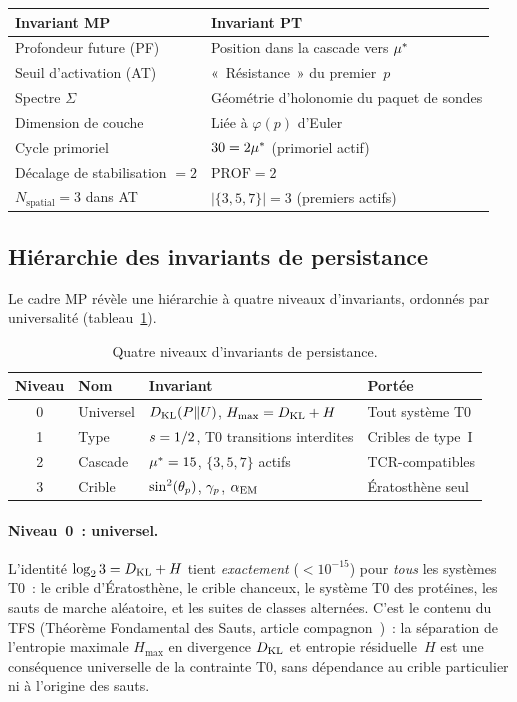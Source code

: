 \documentclass[12pt,a4paper]{article}
\begin{document}
\begin{center}
\begin{tabular}{ll}
\toprule
\textbf{Invariant MP} & \textbf{Invariant PT} \\
\midrule
Profondeur future (PF) & Position dans la cascade vers ${\mu^{*}}$ \\
Seuil d'activation (AT) & «~Résistance~» du premier~$p$ \\
Spectre $\Sigma$ & Géométrie d'holonomie du paquet de sondes \\
Dimension de couche & Liée à $\varphi(p)$ d'Euler \\
Cycle primoriel & $30 = 2{\mu^{*}}$ (primoriel actif) \\
Décalage de stabilisation $= 2$ & $\mathrm{PROF} = 2$ \\
$N_{\mathrm{spatial}} = 3$ dans AT & $|\{3, 5, 7\}| = 3$ (premiers actifs) \\
\bottomrule
\end{tabular}
\end{center}


\subsection{Hiérarchie des invariants de persistance}
\label{sec:PM_hierarchy}

Le cadre MP révèle une hiérarchie à quatre niveaux d'invariants,
ordonnés par universalité (tableau~\ref{tab:PM_hierarchy}).

\begin{table}[htbp]
\centering
\caption{Quatre niveaux d'invariants de persistance.}
\label{tab:PM_hierarchy}
\begin{tabular}{clll}
\toprule
\textbf{Niveau} & \textbf{Nom} & \textbf{Invariant} & \textbf{Portée} \\
\midrule
0 & Universel & $D_{\mathrm{KL}}(P \| U)$, $H_{\max} = D_{\mathrm{KL}} + H$ & Tout système T0 \\
1 & Type & $s = 1/2$, T0 transitions interdites & Cribles de type~I \\
2 & Cascade & ${\mu^{*}} = 15$, $\{3,5,7\}$ actifs & TCR-compatibles \\
3 & Crible & $\sin^2(\theta_{p})$, $\gamma_{p}$, $\alpha_{\mathrm{EM}}$ & Ératosthène seul \\
\bottomrule
\end{tabular}
\end{table}

\paragraph{Niveau~0~: universel.}
L'identité $\log_2 3 = D_{\mathrm{KL}} + H$ tient \emph{exactement}
($< 10^{-15}$) pour \emph{tous} les systèmes T0~: le crible
d'Ératosthène, le crible chanceux, le système T0 des protéines, les
sauts de marche aléatoire, et les suites de classes alternées. C'est
le contenu du TFS (Théorème Fondamental des Sauts, article
compagnon~\cite{companion_M1})~: la séparation de l'entropie maximale
$H_{\max}$ en divergence $D_{\mathrm{KL}}$ et entropie résiduelle~$H$ est une
conséquence universelle de la contrainte T0, sans dépendance au
crible particulier ni à l'origine des sauts.
\end{document}
